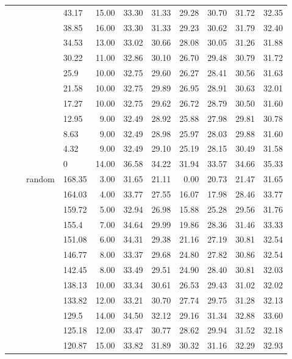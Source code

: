 \begin{longtable}{llllrrrrrrr}
   &  &  & 43.17 & 15.00 & 33.30 & 31.33 & 29.28 & 30.70 & 31.72 & 32.35 \\ 
   &  &  & 38.85 & 16.00 & 33.30 & 31.33 & 29.23 & 30.62 & 31.79 & 32.40 \\ 
   &  &  & 34.53 & 13.00 & 33.02 & 30.66 & 28.08 & 30.05 & 31.26 & 31.88 \\ 
   &  &  & 30.22 & 11.00 & 32.86 & 30.10 & 26.70 & 29.48 & 30.79 & 31.72 \\ 
   &  &  & 25.9 & 10.00 & 32.75 & 29.60 & 26.27 & 28.41 & 30.56 & 31.63 \\ 
   &  &  & 21.58 & 10.00 & 32.75 & 29.89 & 26.95 & 28.91 & 30.63 & 32.01 \\ 
   &  &  & 17.27 & 10.00 & 32.75 & 29.62 & 26.72 & 28.79 & 30.50 & 31.60 \\ 
   &  &  & 12.95 & 9.00 & 32.49 & 28.92 & 25.88 & 27.98 & 29.81 & 30.78 \\ 
   &  &  & 8.63 & 9.00 & 32.49 & 28.98 & 25.97 & 28.03 & 29.88 & 31.60 \\ 
   &  &  & 4.32 & 9.00 & 32.49 & 29.10 & 25.19 & 28.15 & 30.49 & 31.58 \\ 
   &  &  & 0 & 14.00 & 36.58 & 34.22 & 31.94 & 33.57 & 34.66 & 35.33 \\ 
   &  & random & 168.35 & 3.00 & 31.65 & 21.11 & 0.00 & 20.73 & 21.47 & 31.65 \\ 
   &  &  & 164.03 & 4.00 & 33.77 & 27.55 & 16.07 & 17.98 & 28.46 & 33.77 \\ 
   &  &  & 159.72 & 5.00 & 32.94 & 26.98 & 15.88 & 25.28 & 29.56 & 31.76 \\ 
   &  &  & 155.4 & 7.00 & 34.64 & 29.99 & 19.86 & 28.36 & 31.46 & 33.33 \\ 
   &  &  & 151.08 & 6.00 & 34.31 & 29.38 & 21.16 & 27.19 & 30.81 & 32.54 \\ 
   &  &  & 146.77 & 8.00 & 33.37 & 29.68 & 24.80 & 27.82 & 30.86 & 32.54 \\ 
   &  &  & 142.45 & 8.00 & 33.49 & 29.51 & 24.90 & 28.40 & 30.81 & 32.03 \\ 
   &  &  & 138.13 & 10.00 & 33.34 & 30.61 & 26.53 & 29.43 & 31.02 & 32.02 \\ 
   &  &  & 133.82 & 12.00 & 33.21 & 30.70 & 27.74 & 29.75 & 31.28 & 32.13 \\ 
   &  &  & 129.5 & 14.00 & 34.50 & 32.12 & 29.16 & 31.34 & 32.88 & 33.60 \\ 
   &  &  & 125.18 & 12.00 & 33.47 & 30.77 & 28.62 & 29.94 & 31.52 & 32.18 \\ 
   &  &  & 120.87 & 15.00 & 33.82 & 31.89 & 30.32 & 31.16 & 32.29 & 32.93 \\ 

\end{longtable}
